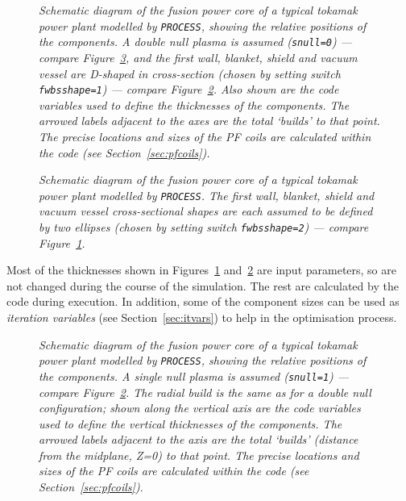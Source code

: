 \documentclass[11pt,a4paper]{report}
\newcommand{\process}{\mbox{\texttt{PROCESS}}}
\begin{document}
\begin{figure}[tbph]
\caption[Machine build for D-shaped major components]
{\label{fig:build_d} \textit{Schematic diagram of the fusion
    power core of a typical tokamak power plant modelled by \process, showing
    the relative positions of the components. A double null plasma is assumed
    (\texttt{snull=0}) --- compare Figure~\ref{fig:buildsnd}, and the first
    wall, blanket, shield and vacuum vessel are D-shaped in cross-section
    (chosen by setting switch \texttt{fwbsshape=1}) --- compare
    Figure~\ref{fig:build_e}. Also shown are the code variables used to define
    the thicknesses of the components. The arrowed labels adjacent to the axes
    are the total `builds' to that point. The precise locations and sizes of
    the PF coils are calculated within the code (see
    Section~\ref{sec:pfcoils}).}  }
\end{figure}

\begin{figure}[tbph]
\caption[Machine build for elliptical-shaped major components]
{\label{fig:build_e} \textit{Schematic diagram of the fusion
    power core of a typical tokamak power plant modelled by \process. The
    first wall, blanket, shield and vacuum vessel cross-sectional shapes are
    each assumed to be defined by two ellipses (chosen by setting switch
    \texttt{fwbsshape=2}) --- compare Figure~\ref{fig:build_d}.}  }
\end{figure}

Most of the thicknesses shown in Figures~\ref{fig:build_d} and~\ref{fig:build_e}
are input parameters, so are not changed during the course of the simulation.
The rest are calculated by the code during execution. In addition, some of the
component sizes can be used as \textit{iteration variables}\/ (see
Section~\ref{sec:itvars}) to help in the optimisation process.

\begin{figure}[tbph]
\caption[Machine build for a single-null device]
{\label{fig:buildsnd}
  \textit{Schematic diagram of the fusion power core of a typical tokamak
    power plant modelled by \process, showing the relative positions of the
    components. A single null plasma is assumed (\texttt{snull=1}) --- compare
    Figure~\ref{fig:build_e}. The radial build is the same as for a double null
    configuration; shown along the vertical axis are the code variables used
    to define the vertical thicknesses of the components. The arrowed labels
    adjacent to the axis are the total `builds' (distance from the midplane,
    Z=0) to that point. The precise locations and sizes of the  PF coils are
    calculated within the code (see Section~\ref{sec:pfcoils}).}
}
\end{figure}
\end{document}
